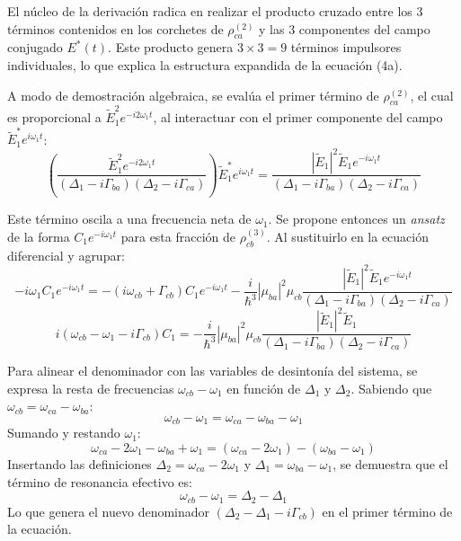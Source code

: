 \documentclass[12pt,a4paper]{article}
\begin{document}
El núcleo de la derivación radica en realizar el producto cruzado entre los $3$ términos contenidos en los corchetes de $\rho_{ca}^{(2)}$ y las $3$ componentes del campo conjugado $E^*(t)$. Este producto genera $3 \times 3 = 9$ términos impulsores individuales, lo que explica la estructura expandida de la ecuación (4a).

A modo de demostración algebraica, se evalúa el primer término de $\rho_{ca}^{(2)}$, el cual es proporcional a $\tilde{E}_1^2 e^{-i2\omega_1 t}$, al interactuar con el primer componente del campo $\tilde{E}_1^* e^{i\omega_1 t}$:
\begin{equation}
\left( \frac{\tilde{E}_1^2 e^{-i2\omega_1 t}}{(\Delta_1 - i\Gamma_{ba})(\Delta_2 - i\Gamma_{ca})} \right) \tilde{E}_1^* e^{i\omega_1 t} = \frac{|\tilde{E}_1|^2 \tilde{E}_1 e^{-i\omega_1 t}}{(\Delta_1 - i\Gamma_{ba})(\Delta_2 - i\Gamma_{ca})}
\end{equation}

Este término oscila a una frecuencia neta de $\omega_1$. Se propone entonces un \textit{ansatz} de la forma $C_1 e^{-i\omega_1 t}$ para esta fracción de $\rho_{cb}^{(3)}$. Al sustituirlo en la ecuación diferencial y agrupar:
\begin{equation}
-i\omega_1 C_1 e^{-i\omega_1 t} = -(i\omega_{cb} + \Gamma_{cb}) C_1 e^{-i\omega_1 t} - \frac{i}{\hbar^3} |\mu_{ba}|^2 \mu_{cb} \frac{|\tilde{E}_1|^2 \tilde{E}_1 e^{-i\omega_1 t}}{(\Delta_1 - i\Gamma_{ba})(\Delta_2 - i\Gamma_{ca})}
\end{equation}
\begin{equation}
i(\omega_{cb} - \omega_1 - i\Gamma_{cb}) C_1 = - \frac{i}{\hbar^3} |\mu_{ba}|^2 \mu_{cb} \frac{|\tilde{E}_1|^2 \tilde{E}_1}{(\Delta_1 - i\Gamma_{ba})(\Delta_2 - i\Gamma_{ca})}
\end{equation}

Para alinear el denominador con las variables de desintonía del sistema, se expresa la resta de frecuencias $\omega_{cb} - \omega_1$ en función de $\Delta_1$ y $\Delta_2$. Sabiendo que $\omega_{cb} = \omega_{ca} - \omega_{ba}$:
\begin{equation}
\omega_{cb} - \omega_1 = \omega_{ca} - \omega_{ba} - \omega_1
\end{equation}
Sumando y restando $\omega_1$:
\begin{equation}
\omega_{ca} - 2\omega_1 - \omega_{ba} + \omega_1 = (\omega_{ca} - 2\omega_1) - (\omega_{ba} - \omega_1)
\end{equation}
Insertando las definiciones $\Delta_2 = \omega_{ca} - 2\omega_1$ y $\Delta_1 = \omega_{ba} - \omega_1$, se demuestra que el término de resonancia efectivo es:
\begin{equation}
\omega_{cb} - \omega_1 = \Delta_2 - \Delta_1
\end{equation}
Lo que genera el nuevo denominador $(\Delta_2 - \Delta_1 - i\Gamma_{cb})$ en el primer término de la ecuación.
\end{document}
